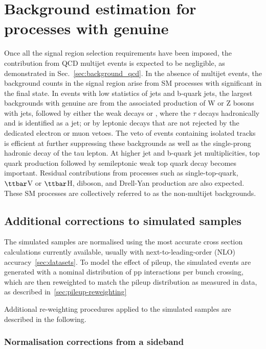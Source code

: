 
\section{Background estimation for processes with genuine \met}
\label{sec:backgroundmet}

Once all the signal region selection requirements have been imposed,
the contribution from QCD multijet events is expected to be
negligible, as demonstrated in Sec.~\ref{sec:background_qcd}. 
In the absence of multijet events, the background counts in the signal region arise from
SM processes with significant \met in the final state. In events with
low statistics of jets and b-quark jets, the largest backgrounds with
genuine \met are from the associated production of W or Z bosons with
jets, followed by either the weak decays \znunu or \wtaunu, where the
$\tau$ decays hadronically and is identified as a jet; or by leptonic
decays that are not rejected by the dedicated electron or muon
vetoes. The veto of events containing isolated tracks is efficient at
further suppressing these backgrounds as well as the single-prong
hadronic decay of the tau lepton. At higher jet and b-quark jet
multiplicities, top quark production followed by semileptonic weak top
quark decay becomes important.  Residual contributions from processes
such as single-top-quark, $\ttbar$V or $\ttbar$H, diboson, and
Drell-Yan production are also expected. These SM processes are
collectively referred to as the non-multijet backgrounds.

\subsection{Additional corrections to simulated samples}
\label{sec:mc-corrections}

The simulated samples are normalised using the most accurate cross
section calculations currently available, usually with
next-to-leading-order (NLO) accuracy~\ref{sec:datasets}. 
To model the effect of pileup, the simulated events are generated with a nominal distribution
of pp interactions per bunch crossing, which are then reweighted
to match the pileup distribution as measured in data, as described in~\ref{sec:pileup-reweighting}

Additional re-weighting procedures applied to the simulated samples are described in the following.

\subsubsection{Normalisation corrections from a \mht sideband}
\label{sec:sideband-corrections}

